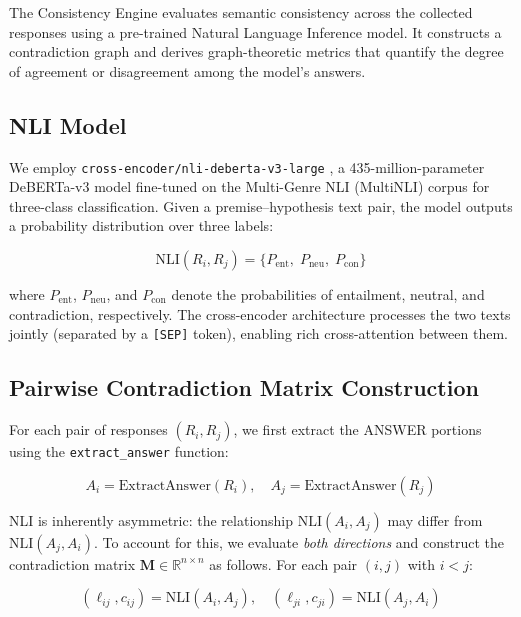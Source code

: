 The Consistency Engine evaluates semantic consistency across the collected responses using a pre-trained Natural Language Inference model. It constructs a contradiction graph and derives graph-theoretic metrics that quantify the degree of agreement or disagreement among the model's answers.

\subsection{NLI Model}

We employ \texttt{cross-encoder/nli-deberta-v3-large} \cite{he2021debertav3}, a 435-million-parameter DeBERTa-v3 model fine-tuned on the Multi-Genre NLI (MultiNLI) corpus for three-class classification. Given a premise--hypothesis text pair, the model outputs a probability distribution over three labels:

\begin{equation}
    \text{NLI}(R_i, R_j) = \{P_{\text{ent}}, \; P_{\text{neu}}, \; P_{\text{con}}\}
\end{equation}

\noindent
where $P_{\text{ent}}$, $P_{\text{neu}}$, and $P_{\text{con}}$ denote the probabilities of entailment, neutral, and contradiction, respectively. The cross-encoder architecture processes the two texts jointly (separated by a \texttt{[SEP]} token), enabling rich cross-attention between them.

\subsection{Pairwise Contradiction Matrix Construction}

For each pair of responses $(R_i, R_j)$, we first extract the ANSWER portions using the \texttt{extract\_answer} function:

\begin{equation}
    A_i = \text{ExtractAnswer}(R_i), \quad A_j = \text{ExtractAnswer}(R_j)
\end{equation}

\noindent
NLI is inherently asymmetric: the relationship $\text{NLI}(A_i, A_j)$ may differ from $\text{NLI}(A_j, A_i)$. To account for this, we evaluate \emph{both directions} and construct the contradiction matrix $\mathbf{M} \in \mathbb{R}^{n \times n}$ as follows. For each pair $(i, j)$ with $i < j$:

\begin{equation}
    (\ell_{ij}, c_{ij}) = \text{NLI}(A_i, A_j), \quad (\ell_{ji}, c_{ji}) = \text{NLI}(A_j, A_i)
\end{equation}

